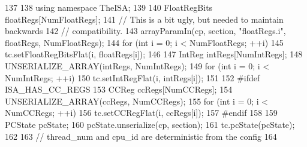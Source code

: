 \begin{DoxyCode}
137 {
138     using namespace TheISA;
139 
140     FloatRegBits floatRegs[NumFloatRegs];
141     // This is a bit ugly, but needed to maintain backwards
142     // compatibility.
143     arrayParamIn(cp, section, "floatRegs.i", floatRegs, NumFloatRegs);
144     for (int i = 0; i < NumFloatRegs; ++i)
145         tc.setFloatRegBitsFlat(i, floatRegs[i]);
146 
147     IntReg intRegs[NumIntRegs];
148     UNSERIALIZE_ARRAY(intRegs, NumIntRegs);
149     for (int i = 0; i < NumIntRegs; ++i)
150         tc.setIntRegFlat(i, intRegs[i]);
151 
152 #ifdef ISA_HAS_CC_REGS
153     CCReg ccRegs[NumCCRegs];
154     UNSERIALIZE_ARRAY(ccRegs, NumCCRegs);
155     for (int i = 0; i < NumCCRegs; ++i)
156         tc.setCCRegFlat(i, ccRegs[i]);
157 #endif
158 
159     PCState pcState;
160     pcState.unserialize(cp, section);
161     tc.pcState(pcState);
162 
163     // thread_num and cpu_id are deterministic from the config
164 }
\end{DoxyCode}
